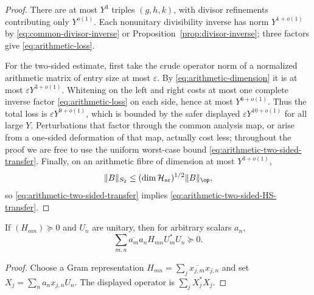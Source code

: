 \begin{proof}
There are at most $Y^3$ triples $(g,h,k)$, with divisor refinements contributing
only $Y^{o(1)}$. Each nonunitary divisibility inverse has norm
$Y^{1+o(1)}$ by \eqref{eq:common-divisor-inverse} or
Proposition~\ref{prop:divisor-inverse}; three factors give
\eqref{eq:arithmetic-loss}.

For the two-sided estimate, first take the crude operator norm of a normalized
arithmetic matrix of entry size at most $\varepsilon$. By
\eqref{eq:arithmetic-dimension} it is at most
$\varepsilon Y^{3+o(1)}$. Whitening on the left and right costs at most one
complete inverse factor \eqref{eq:arithmetic-loss} on each side, hence at most
$Y^{6+o(1)}$. Thus the total loss is
$\varepsilon Y^{9+o(1)}$, which is bounded by the safer displayed
$\varepsilon Y^{10+o(1)}$ for all large $Y$. Perturbations that factor through
the common analysis map, or arise from a one-sided deformation of that map,
actually cost less; throughout the proof we are free to use the uniform
worst-case bound \eqref{eq:arithmetic-two-sided-transfer}. Finally, on an
arithmetic fibre of dimension at most $Y^{3+o(1)}$,
\[
\|B\|_{S_2}\le(\dim\mathcal H_{\rm ar})^{1/2}\|B\|_{\op},
\]
so \eqref{eq:arithmetic-two-sided-transfer} implies
\eqref{eq:arithmetic-two-sided-HS-transfer}.
\end{proof}

\begin{lemma}
\label{lem:operator-gram}
If $(H_{mn})\succeq0$ and $U_n$ are unitary, then for arbitrary scalars $a_n$,
\[
\sum_{m,n}\overline{a_m}a_nH_{mn}U_m^*U_n\succeq0.
\]
\end{lemma}

\begin{proof}
Choose a Gram representation
$H_{mn}=\sum_j\overline{x_{j,m}}x_{j,n}$ and set
$X_j=\sum_na_nx_{j,n}U_n$. The displayed operator is
$\sum_jX_j^*X_j$.
\end{proof}
